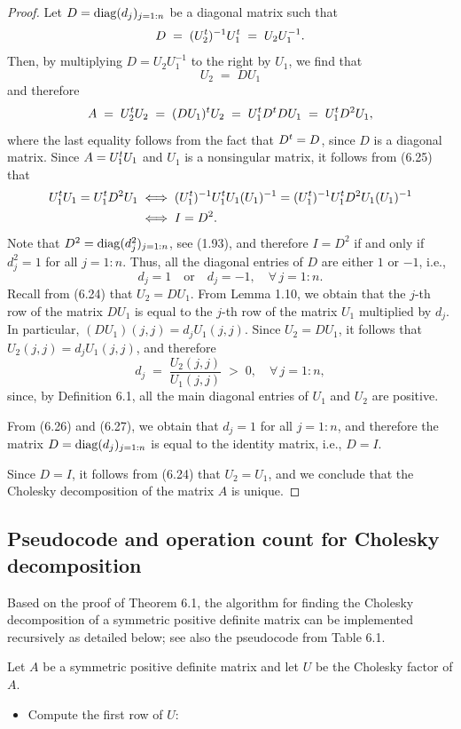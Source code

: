 \begin{proof}
Let $D = \operatorname{diag}(d_j)_{j=1:n}$ be a diagonal matrix such that
\[
D \;=\; (U_2^{t})^{-1}U_1^{t} \;=\; U_2U_1^{-1}.
\]
Then, by multiplying $D = U_2U_1^{-1}$ to the right by $U_1$, we find that
\begin{equation}
U_2 \;=\; DU_1
\end{equation}
and therefore
\begin{equation}
A \;=\; U_2^{t} U_2 \;=\; (DU_1)^{t} U_2 \;=\; U_1^{t} D^{t} DU_1 \;=\; U_1^{t} D^2 U_1,
\end{equation}
where the last equality follows from the fact that $D^{t} = D$, since $D$ is a diagonal
matrix. Since $A = U_1^{t} U_1$ and $U_1$ is a nonsingular matrix, it follows from
(6.25) that
\begin{align*}
U_1^{t} U_1 = U_1^{t} D^2 U_1 &\iff (U_1^{t})^{-1}U_1^{t} U_1(U_1)^{-1} = (U_1^{t})^{-1}U_1^{t}
D^2 U_1(U_1)^{-1} \\
&\iff I = D^2.
\end{align*}
Note that $D^2 = \operatorname{diag}(d_j^2)_{j=1:n}$, see (1.93), and therefore $I = D^2$ if and only
if $d_j^2 = 1$ for all $j = 1:n$. Thus, all the diagonal entries of $D$ are either $1$
or $-1$, i.e.,
\begin{equation}
d_j = 1 \quad \text{or} \quad d_j = -1, \quad \forall\, j = 1:n.
\end{equation}
Recall from (6.24) that $U_2 = DU_1$. From Lemma 1.10, we obtain that the $j$-th row of
the matrix $DU_1$ is equal to the $j$-th row of the matrix $U_1$ multiplied by $d_j$.
In particular, $(DU_1)(j,j) = d_jU_1(j,j)$. Since $U_2 = DU_1$, it follows that
$U_2(j,j) = d_jU_1(j,j)$, and therefore
\begin{equation}
d_j \;=\; \frac{U_2(j,j)}{U_1(j,j)} \;>\; 0, \quad \forall\, j = 1:n,
\end{equation}
since, by Definition 6.1, all the main diagonal entries of $U_1$ and $U_2$ are
positive.

From (6.26) and (6.27), we obtain that $d_j = 1$ for all $j = 1:n$, and therefore the
matrix $D = \operatorname{diag}(d_j)_{j=1:n}$ is equal to the identity matrix, i.e., $D = I$.

Since $D = I$, it follows from (6.24) that $U_2 = U_1$, and we conclude that the
Cholesky decomposition of the matrix $A$ is unique.
\end{proof}

\subsection{Pseudocode and operation count for Cholesky decomposition}

Based on the proof of Theorem 6.1, the algorithm for finding the Cholesky decomposition
of a symmetric positive definite matrix can be implemented recursively as detailed
below; see also the pseudocode from Table 6.1.

Let $A$ be a symmetric positive definite matrix and let $U$ be the Cholesky factor of
$A$.

\begin{itemize}
\item Compute the first row of $U$:
\end{itemize}
